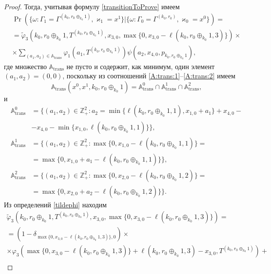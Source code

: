 \documentclass[a4paper,12pt,russian]{extarticle}
\begin{document}
\begin{proof}
Тогда, учитывая формулу \eqref{transitionToProve} имеем
\begin{multline*}
\Pr (\{\omega\colon \Gamma_{1}=\Gamma^{(k_0,r_0\oplus_{k_0}1)},\varkappa_{1}=x^1 \}|\{\omega\colon  \Gamma_{0}=\Gamma^{(k_0,r_0)},\varkappa_0=x^0\})=\\
=\widetilde{\varphi}_3(k_0,r_0\oplus_{k_0}1,T^{(k_0,r_0\oplus_{k_0}1)},x_{3,0},\max{\{0,x_{3,0} - \ell(k_0,r_0\oplus_{k_0}1,3)\}})\times \\
\times
\sum_{(a_1,a_2)\in {\mathbb A}_{\mathrm{trans}}}\varphi_1(a_1,T^{(k_0,r_0\oplus_{k_0}1)})  \psi(a_2,x_{4,0}, p_{k_0,r_0\oplus_{k_0}1}),
\end{multline*}
где множество ${\mathbb A}_{\mathrm{trans}}$ не пусто и содержит, как минимум, один элемент $(a_1,a_2)=(0,0)$, поскольку из соотношений \eqref{A:trans:1}--\eqref{A:trans:2} имеем
\begin{equation*}
{\mathbb A}_{\mathrm{trans}}(x^0,x^1,k_0,r_0\oplus_{k_0}1) = {\mathbb A}_{\mathrm{trans}}^0 \cap {\mathbb A}_{\mathrm{trans}}^1\cap {\mathbb A}_{\mathrm{trans}}^2,
\end{equation*}
и
\begin{align*}
{\mathbb A}_{\mathrm{trans}}^0 &= \{(a_1,a_2) \in \mathbb{Z}_+^2 \colon a_2 = \min{\{\ell(k_0,r_0\oplus_{k_0}1,1), x_{1,0}+a_1}\} +x_{4,0}- \\ 
&-x_{4,0} - \min{\{x_{1,0}, \ell(k_0,r_0\oplus_{k_0}1,1)\}}\},\\
{\mathbb A}_{\mathrm{trans}}^1 &= \{(a_1,a_2) \in \mathbb{Z}_+^2 \colon \max{\{0,x_{1,0} - \ell(k_0,r_0\oplus_{k_0}1,1)\}}=\\
&=\max{\{0,x_{1,0}+a_1-\ell(k_0,r_0\oplus_{k_0}1,1)\}}\},\\
 {\mathbb A}_{\mathrm{trans}}^2 &= \{(a_1,a_2) \in \mathbb{Z}_+^2 \colon  \max{\{0,x_{2,0} - \ell(k_0,r_0\oplus_{k_0}1,2)\}}=\\
 &=\max{\{0,x_{2,0}+a_2-\ell(k_0,r_0\oplus_{k_0}1,2)\}}\}.
\end{align*}
Из определений \eqref{tildephi} находим
\begin{multline*}
\widetilde{\varphi}_3(k_0,r_0\oplus_{k_0}1,T^{(k_0,r_0\oplus_{k_0}1)},x_{3,0},\max{\{0,x_{3,0} - \ell(k_0,r_0\oplus_{k_0}1,3)\}})= \\=(1-\delta_{\max{\{0,x_{3,0} - \ell(k_0,r_0\oplus_{k_0}1,3)\}},0}) \times \\\times\varphi_3(\max{\{0,x_{3,0} - \ell(k_0,r_0\oplus_{k_0}1,3)\}} + \ell (k_0,r_0\oplus_{k_0}1,3) - x_{3,0},T^{(k_0,r_0\oplus_{k_0}1)} ) +\\

\end{multline*}
\end{proof}
\end{document}
